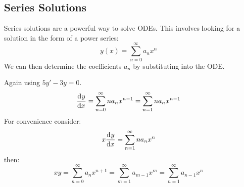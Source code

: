 \documentclass[../main.tex]{subfiles}
\begin{document}
\subsection{Series Solutions}
Series solutions are a powerful way to solve ODEs.
This involves looking for a solution in the form of a power series:
\[
  y(x) = \sum_{n=0}^{\infty} a_n x^{n}
\]
We can then determine the coefficients $a_n$ by substituting into the ODE.
\begin{example}
  Again using $5y' - 3y = 0$.
  \[
    \deriv{y}{x} = \sum_{n=0}^{\infty} na_n x^{n-1} = \sum_{n=1}^{\infty} na_nx^{n-1}
  \]
  For convenience consider:
  \[
    x \deriv{y}{x} = \sum_{n=1}^{\infty} na_n x^{n}
  \]
  then:
  \[
    xy = \sum_{n=0}^{\infty} a_n x^{n + 1} = \sum_{m = 1}^{\infty} a_{m-1}x^{m} = \sum_{n = 1}^{\infty} a_{n-1}x^{n}
  \]
\end{example}
\end{document}
